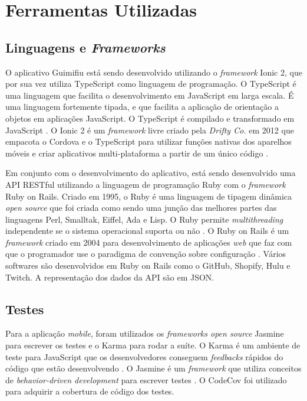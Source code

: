 \section{Ferramentas Utilizadas}

\subsection{Linguagens e \textit{Frameworks}}

O aplicativo Guimifiu está sendo desenvolvido utilizando o \textit{framework} Ionic 2, que por sua vez utiliza TypeScript como linguagem de programação. O TypeScript é uma linguagem que facilita o desenvolvimento em JavaScript em larga escala. É uma linguagem fortemente tipada, e que facilita a aplicação de orientação a objetos em aplicações JavaScript. O TypeScript é compilado e transformado em JavaScript \cite{typescript}. O Ionic 2 é um \textit{framework} livre criado pela \textit{Drifty Co.} em 2012 que empacota o Cordova e o TypeScript para utilizar funções nativas dos aparelhos móveis e criar aplicativos multi-plataforma a partir de um único código \cite{ionic-2}.

Em conjunto com o desenvolvimento do aplicativo, está sendo desenvolvido uma API RESTful utilizando a linguagem de programação Ruby com o \textit{framework} Ruby on Rails. Criado em 1995, o Ruby é uma linguagem de tipagem dinâmica \textit{open source} que foi criada como sendo uma junção das melhores partes das linguagens Perl, Smalltak, Eiffel, Ada e Lisp. O Ruby permite \textit{multithreading} independente se o sistema operacional suporta ou não \cite{ruby-wow}. O Ruby on Rails é um \textit{framework} criado em 2004 para desenvolvimento de aplicações \textit{web} que faz com que o programador use o paradigma de convenção sobre configuração \cite{rails}. Vários softwares são desenvolvidos em Ruby on Rails como o GitHub, Shopify, Hulu e Twitch. A representação dos dados da API são em JSON.

\subsection{Testes}

Para a aplicação \textit{mobile}, foram utilizados os \textit{frameworks open source} Jasmine para escrever os testes e o Karma para rodar a suíte. O Karma é um ambiente de teste para JavaScript que os desenvolvedores conseguem \textit{feedbacks} rápidos do código que estão desenvolvendo \cite{karma}. O Jasmine é um \textit{framework} que utiliza conceitos de \textit{behavior-driven development} para escrever testes \cite{jasmine}. O CodeCov foi utilizado para adquirir a cobertura de código dos testes.

